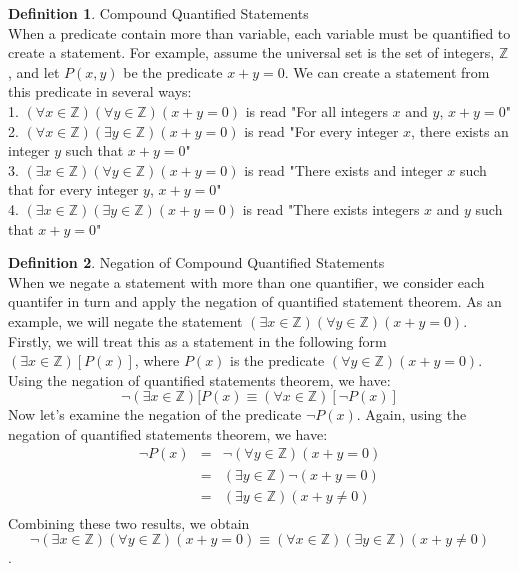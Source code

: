 \documentclass{book}
\theoremstyle{definition}
\newtheorem{definition}{Definition}[section]
\theoremstyle{remark}
\newcommand{\bb}[1]{\mathbb{#1}}
\begin{document}
\begin{definition}
Compound Quantified Statements \\

When a predicate contain more than variable, each variable must be quantified to create a statement. For example, assume  the universal set is the set of integers, $\bb{Z}$, and let $P(x,y)$ be the predicate $x + y = 0$. We can create a statement from this predicate in several ways: \\
1. $(\forall x \in \bb{Z})(\forall y \in \bb{Z})(x + y = 0)$ is read "For all integers $x$ and $y$, $x + y = 0$" \\
2. $(\forall x \in \bb{Z})(\exists y \in \bb{Z})(x + y = 0)$ is read "For every integer $x$, there exists an integer $y$ such that $x + y = 0$"\\
3. $(\exists x \in \bb{Z})(\forall y \in \bb{Z})(x + y = 0)$ is read "There exists and integer $x$ such that for every integer $y$, $x + y = 0$"\\
4. $(\exists x \in \bb{Z})(\exists y \in \bb{Z})(x + y = 0)$ is read "There exists integers $x$ and $y$ such that $x + y = 0$" \\
\end{definition}


\begin{definition}
Negation of Compound Quantified Statements \\

When we negate a statement with more than one quantifier, we consider each quantifer in turn and apply the negation of quantified statement theorem. As an example, we will negate the statement $(\exists x \in \bb{Z})(\forall y \in \bb{Z})(x + y = 0)$. 
Firstly, we will treat this as a statement in the following form $(\exists x \in \bb{Z})[P(x)]$, where $P(x)$ is the predicate $(\forall y \in \bb{Z})(x + y = 0)$. Using the negation of quantified statements theorem, we have: \[ \neg (\exists x \in \bb{Z})[P(x) \equiv (\forall x \in \bb{Z})[\neg P(x)] \] Now let's  examine the negation of the predicate $\neg P(x)$. Again, using the negation of quantified statements theorem, we have: 
	\begin{eqnarray}
		\neg P(x) & = & \neg (\forall y \in \bb{Z})(x + y = 0) \nonumber \\
		& = & (\exists y \in \bb{Z})\neg (x + y = 0) \nonumber \\
		& = & (\exists y \in \bb{Z})(x + y \neq 0) \nonumber \\
	\end{eqnarray}
Combining these two results, we obtain \[ \neg (\exists x \in \bb{Z})(\forall y \in \bb{Z})(x + y = 0) \equiv (\forall x \in \bb{Z})(\exists y \in \bb{Z})(x + y \neq 0) \].

\end{definition}
\end{document}

